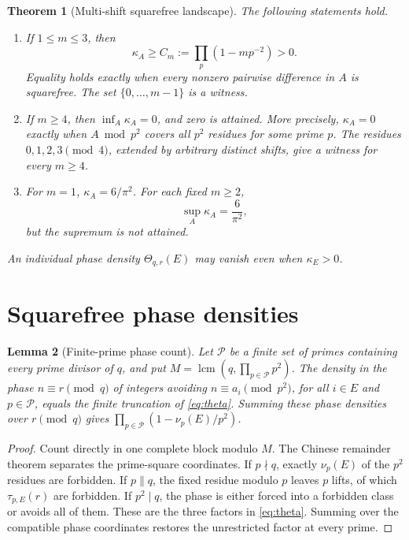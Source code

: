 \documentclass[11pt]{article}
\newtheorem{theorem}{Theorem}[section]
\newtheorem{lemma}[theorem]{Lemma}
\theoremstyle{definition}
\theoremstyle{remark}
\newcommand{\kap}{\kappa}
\DeclareMathOperator{\lcm}{lcm}
\begin{document}
\begin{theorem}[Multi-shift squarefree landscape]
\label{thm:landscape}
The following statements hold.
\begin{enumerate}[label=\textup{(\roman*)}]
 \item If \(1\le m\le3\), then
 \[
  \kap_A\ge C_m:=\prod_p(1-mp^{-2})>0.
 \]
 Equality holds exactly when every nonzero pairwise difference in \(A\) is
 squarefree.  The set \(\{0,\ldots,m-1\}\) is a witness.
 \item If \(m\ge4\), then \(\inf_A\kap_A=0\), and zero is attained.
 More precisely, \(\kap_A=0\) exactly when \(A\bmod p^2\) covers all
 \(p^2\) residues for some prime \(p\).  The residues \(0,1,2,3\pmod4\),
 extended by arbitrary distinct shifts, give a witness for every \(m\ge4\).
 \item For \(m=1\), \(\kap_A=6/\pi^2\).  For each fixed \(m\ge2\),
 \[
  \sup_A\kap_A=\frac6{\pi^2},
 \]
 but the supremum is not attained.
\end{enumerate}
An individual phase density \(\Theta_{q,r}(E)\) may vanish even when
\(\kap_E>0\).
\end{theorem}

\section{Squarefree phase densities}
\label{sec:density}

\begin{lemma}[Finite-prime phase count]
\label{lem:finite-crt}
Let \(\mathcal P\) be a finite set of primes containing every prime divisor
of \(q\), and put \(M=\lcm(q,\prod_{p\in\mathcal P}p^2)\).  The density in
the phase \(n\equiv r\pmod q\) of integers avoiding
\(n\equiv a_i\pmod{p^2}\), for all \(i\in E\) and
\(p\in\mathcal P\), equals the finite truncation of \eqref{eq:theta}.
Summing these phase densities over \(r\pmod q\) gives
\(\prod_{p\in\mathcal P}(1-\nu_p(E)/p^2)\).
\end{lemma}

\begin{proof}
Count directly in one complete block modulo \(M\).  The Chinese remainder
theorem separates the prime-square coordinates.  If \(p\nmid q\), exactly
\(\nu_p(E)\) of the \(p^2\) residues are forbidden.  If
\(p\parallel q\), the fixed residue modulo \(p\) leaves \(p\) lifts, of
which \(\tau_{p,E}(r)\) are forbidden.  If \(p^2\mid q\), the phase is
either forced into a forbidden class or avoids all of them.  These are the
three factors in \eqref{eq:theta}.  Summing over the compatible phase
coordinates restores the unrestricted factor at every prime.
\end{proof}
\end{document}
